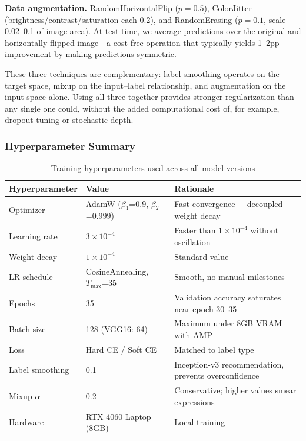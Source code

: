 \documentclass[12pt,a4paper]{article}
\begin{document}
\textbf{Data augmentation.} RandomHorizontalFlip ($p=0.5$), ColorJitter (brightness/contrast/saturation each 0.2), and RandomErasing ($p=0.1$, scale 0.02--0.1 of image area). At test time, we average predictions over the original and horizontally flipped image---a cost-free operation that typically yields 1--2pp improvement by making predictions symmetric.

These three techniques are complementary: label smoothing operates on the target space, mixup on the input--label relationship, and augmentation on the input space alone. Using all three together provides stronger regularization than any single one could, without the added computational cost of, for example, dropout tuning or stochastic depth.

\subsubsection{Hyperparameter Summary}

\begin{table}[H]
\centering
\caption{Training hyperparameters used across all model versions}
\begin{tabular}{lll}
\toprule
Hyperparameter & Value & Rationale \\
\midrule
Optimizer    & AdamW ($\beta_1$=0.9, $\beta_2$=0.999) & Fast convergence + decoupled weight decay \\
Learning rate & $3\times10^{-4}$ & Faster than $1\times10^{-4}$ without oscillation \\
Weight decay & $1\times10^{-4}$ & Standard value \\
LR schedule  & CosineAnnealing, $T_{\max}$=35 & Smooth, no manual milestones \\
Epochs       & 35 & Validation accuracy saturates near epoch 30--35 \\
Batch size   & 128 (VGG16: 64) & Maximum under 8GB VRAM with AMP \\
Loss         & Hard CE / Soft CE & Matched to label type \\
Label smoothing & 0.1 & Inception-v3 recommendation, prevents overconfidence \\
Mixup $\alpha$ & 0.2 & Conservative; higher values smear expressions \\
Hardware     & RTX 4060 Laptop (8GB) & Local training \\
\bottomrule
\end{tabular}
\end{table}
\end{document}
